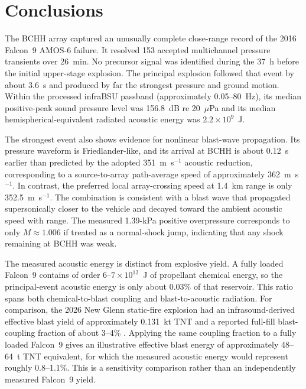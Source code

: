 \documentclass[]{seismica}
\begin{document}
\section{Conclusions}
\label{sec:conclusions}

The BCHH array captured an unusually complete close-range record of the 2016
Falcon~9 AMOS-6 failure. It resolved 153 accepted multichannel pressure
transients over 26~min. No precursor signal was identified during the 37~h
before the initial upper-stage explosion. The principal explosion followed
that event by about 3.6~s and produced by far the strongest pressure and ground
motion. Within the processed infraBSU passband (approximately 0.05--80~Hz),
its median positive-peak sound pressure level was 156.8~dB re 20~$\mu$Pa and
its median hemispherical-equivalent radiated acoustic energy was
$2.2\times10^9$~J.

The strongest event also shows evidence for nonlinear blast-wave propagation.
Its pressure waveform is Friedlander-like, and its arrival at BCHH is about
0.12~s earlier than predicted by the adopted 351~m~s$^{-1}$ acoustic
reduction, corresponding to a source-to-array path-average speed of
approximately 362~m~s$^{-1}$. In contrast, the preferred local
array-crossing speed at 1.4~km range is only 352.5~m~s$^{-1}$. The combination
is consistent with a blast wave that propagated supersonically closer to the
vehicle and decayed toward the ambient acoustic speed with range. The measured
1.39-kPa positive overpressure corresponds to only $M\approx1.006$ if treated
as a normal-shock jump, indicating that any shock remaining at BCHH was weak.

The measured acoustic energy is distinct from explosive yield. A fully loaded
Falcon~9 contains of order $6$--$7\times10^{12}$~J of propellant chemical
energy, so the principal-event acoustic energy is only about 0.03\% of that
reservoir. This ratio spans both chemical-to-blast coupling and
blast-to-acoustic radiation. For comparison, the 2026 New Glenn static-fire
explosion had an infrasound-derived effective blast yield of approximately
0.131~kt TNT and a reported full-fill blast-coupling fraction of about
3--4\% \citep{silber_scamfer_newglenn_2026}. Applying the same coupling
fraction to a fully loaded Falcon~9 gives an illustrative effective blast
energy of approximately 48--64~t TNT equivalent, for which the measured
acoustic energy would represent roughly 0.8--1.1\%. This is a sensitivity
comparison rather than an independently measured Falcon~9 yield.
\end{document}

